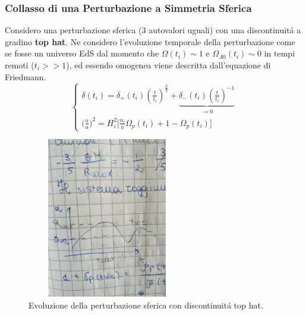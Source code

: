 \documentclass[12pt, a4paper]{article}
\begin{document}
\subsubsection{Collasso di una Perturbazione a Simmetria Sferica}
Considero una perturbazione sferica (3 autovalori uguali) con una discontinuit\'{a} a gradino \textbf{top hat}. Ne considero l'evoluzione temporale della perturbazione come se fosse un universo EdS dal momento che $\Omega(t_i)\sim1$ e $\Omega_{\Lambda0}(t_i)\sim 0$ in tempi remoti ($t_i>>1$), ed essendo omogenea viene descritta dall'equazione di Friedmann.
\begin{equation}
\begin{cases}
\delta(t_i)=\delta_{+}(t_i) (\frac{t}{t_i})^{\frac{2}{3}}+\underbrace{\delta_{-}(t_i)(\frac{t}{t_i})^{-1}}_{\rightarrow 0}
\\
\big(\frac{\dot{a}}{a}\big)^2=H_i^2\big[\frac{a_i}{a}\Omega_p(t_i)+1-\Omega_p(t_i)\big]
\end{cases}
\end{equation}
\begin{figure}[htp]
\centering
\includegraphics[width=7cm, height=7cm]{images/tophat.jpeg}
\caption{Evoluzione della perturbazione sferica con discontinuit\'{a} top hat.}
\label{fig:tophat}
\end{figure}
\end{document}
